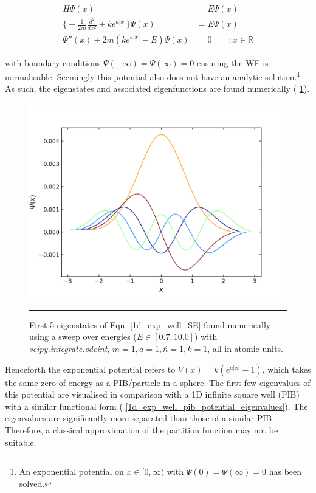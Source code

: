 \documentclass[../main.tex]{subfiles}
\begin{document}
\begin{equation}
\begin{aligned}
\hat{H}\Psi(x) &= E \Psi(x) \\
{\Big \{} -\frac{1}{2m} \frac{d^2}{d x^2} + k e^{a|x|} {\Big \}}\Psi(x) &= E\Psi(x) \\ 
\Psi''(x) + 2m(k e^{a|x|} - E)\Psi(x) &= 0 \qquad : x \in \mathbb{R}
\end{aligned}
\label{1d_exp_well_SE}
\end{equation}

with boundary conditions $\Psi(-\infty) =  \Psi(\infty) = 0$ ensuring the WF is normalisable. Seemingly this potential also does not have an analytic solution.\footnote{An exponential potential on $x \in [0, \infty)$ with $\Psi(0)=\Psi(\infty)=0$ has been solved.\cite{Amore2008}} As such, the eigenstates and associated eigenfunctions are found numerically (\figurename{ \ref{wf_1d_exp_well_numerical}}).


\begin{figure}[h!]
	\centering
	\includegraphics[height=8.5cm]{4/figs/wf_1d_exp_well_numerical}
	\vspace{0.2cm}
	\hrule
	\caption{First 5 eigenstates of Eqn. \eqref{1d_exp_well_SE} found numerically using a sweep over energies ($E \in [0.7, 10.0]$) with \emph{scipy.integrate.odeint}, $m=1, a = 1, \hbar = 1, k = 1$, all in atomic units.} 
	\label{wf_1d_exp_well_numerical}
\end{figure}

Henceforth the exponential potential refers to $V(x) = k(e^{a|x|} - 1)$, which takes the same zero of energy as a PIB/particle in a sphere. The first few eigenvalues of this potential are visualised in comparison with a 1D infinite square well (PIB) with a similar functional form (\figurename{ \ref{1d_exp_well_pib_potential_eigenvalues}}). The eigenvalues are significantly more separated than those of a similar PIB. Therefore, a classical approximation of the partition function may not be suitable.
\end{document}
